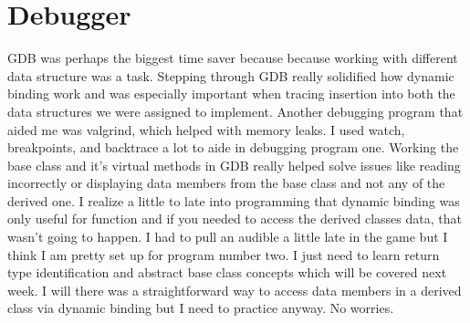 \documentclass[11pt, a4paper]{article}
\begin{document}
\section*{Debugger}
GDB was perhaps the biggest time saver because because working with different data structure was a task. Stepping through GDB really solidified how dynamic binding work and was especially important when tracing insertion into both the data structures we were assigned to implement. Another debugging program that aided me was valgrind, which helped with memory leaks. I used watch, breakpoints, and backtrace a lot to aide in debugging program one. Working the base class and it's virtual methods in GDB really helped solve issues like reading incorrectly or displaying data members from the base class and not any of the derived one. I realize a little to late into programming that dynamic binding was only useful for function and if you needed to access the derived classes data, that wasn't going to happen. I had to pull an audible a little late in the game but I think I am pretty set up for program number two. I just need to learn return type identification and abstract base class concepts which will be covered next week. I will there was a straightforward way to access data members in a derived class via dynamic binding but I need to practice anyway. No worries.
\end{document}
